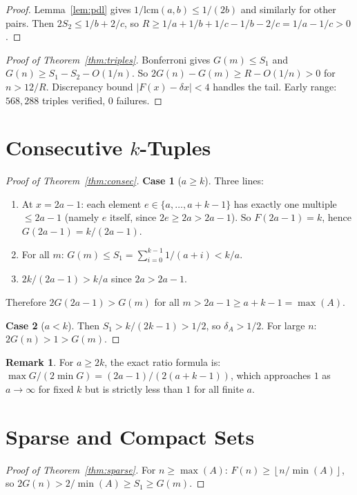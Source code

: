 \documentclass[11pt,a4paper]{article}
\theoremstyle{definition}
\newtheorem{remark}[theorem]{Remark}
\newcommand{\floor}[1]{\left\lfloor #1 \right\rfloor}
\begin{document}
\begin{proof}
Lemma~\ref{lem:pdl} gives $1/\mathrm{lcm}(a,b) \leq 1/(2b)$ and
similarly for other pairs. Then $2S_2 \leq 1/b + 2/c$, so
$R \geq 1/a + 1/b + 1/c - 1/b - 2/c = 1/a - 1/c > 0$.
\end{proof}

\begin{proof}[Proof of Theorem~\ref{thm:triples}]
Bonferroni gives $G(m) \leq S_1$ and $G(n) \geq S_1 - S_2 - O(1/n)$.
So $2G(n) - G(m) \geq R - O(1/n) > 0$ for $n > 12/R$.
Discrepancy bound $|F(x) - \delta x| < 4$ handles the tail.
Early range: $568{,}288$ triples verified, $0$ failures.
\end{proof}

\section{Consecutive $k$-Tuples}

\begin{proof}[Proof of Theorem~\ref{thm:consec}]
\textbf{Case 1} ($a \geq k$). Three lines:
\begin{enumerate}
\item At $x = 2a{-}1$: each element $e \in \{a,\ldots,a{+}k{-}1\}$ has
exactly one multiple $\leq 2a{-}1$ (namely $e$ itself, since
$2e \geq 2a > 2a{-}1$). So $F(2a{-}1) = k$, hence
$G(2a{-}1) = k/(2a{-}1)$.
\item For all $m$: $G(m) \leq S_1 = \sum_{i=0}^{k-1} 1/(a{+}i) < k/a$.
\item $2k/(2a{-}1) > k/a$ since $2a > 2a{-}1$.
\end{enumerate}
Therefore $2G(2a{-}1) > G(m)$ for all $m > 2a{-}1 \geq a{+}k{-}1 = \max(A)$.

\textbf{Case 2} ($a < k$). Then $S_1 > k/(2k{-}1) > 1/2$, so
$\delta_A > 1/2$. For large $n$: $2G(n) > 1 > G(m)$.
\end{proof}

\begin{remark}
For $a \geq 2k$, the exact ratio formula is:
$\max G/(2\min G) = (2a{-}1)/(2(a{+}k{-}1))$,
which approaches $1$ as $a \to \infty$ for fixed $k$ but is strictly
less than $1$ for all finite $a$.
\end{remark}

\section{Sparse and Compact Sets}

\begin{proof}[Proof of Theorem~\ref{thm:sparse}]
For $n \geq \max(A)$: $F(n) \geq \floor{n/\min(A)}$, so
$2G(n) > 2/\min(A) \geq S_1 \geq G(m)$.
\end{proof}
\end{document}
